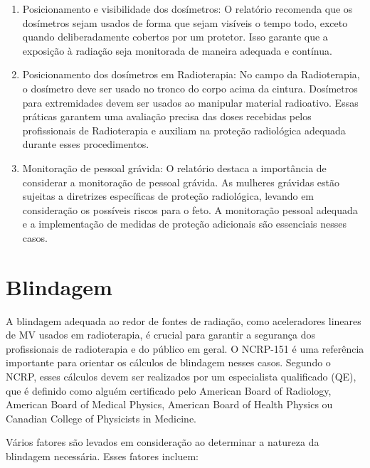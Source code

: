 \documentclass[11pt,a4paper]{article}
\begin{document}
\begin{enumerate}
		\item Posicionamento e visibilidade dos dosímetros: O relatório recomenda que os dosímetros sejam usados de forma que sejam visíveis o tempo todo, exceto quando deliberadamente cobertos por um protetor. Isso garante que a exposição à radiação seja monitorada de maneira adequada e contínua.
		
		\item Posicionamento dos dosímetros em Radioterapia: No campo da Radioterapia, o dosímetro deve ser usado no tronco do corpo acima da cintura. Dosímetros para extremidades devem ser usados ao manipular material radioativo. Essas práticas garantem uma avaliação precisa das doses recebidas pelos profissionais de Radioterapia e auxiliam na proteção radiológica adequada durante esses procedimentos.
		
		\item Monitoração de pessoal grávida: O relatório destaca a importância de considerar a monitoração de pessoal grávida. As mulheres grávidas estão sujeitas a diretrizes específicas de proteção radiológica, levando em consideração os possíveis riscos para o feto. A monitoração pessoal adequada e a implementação de medidas de proteção adicionais são essenciais nesses casos.
	\end{enumerate}



\section{Blindagem}

	A blindagem adequada ao redor de fontes de radiação, como aceleradores lineares de MV usados em radioterapia, é crucial para garantir a segurança dos profissionais de radioterapia e do público em geral. O NCRP-151 é uma referência importante para orientar os cálculos de blindagem nesses casos. Segundo o NCRP, esses cálculos devem ser realizados por um especialista qualificado (QE), que é definido como alguém certificado pelo American Board of Radiology, American Board of Medical Physics, American Board of Health Physics ou Canadian College of Physicists in Medicine.

	Vários fatores são levados em consideração ao determinar a natureza da blindagem necessária. Esses fatores incluem:
\end{document}
